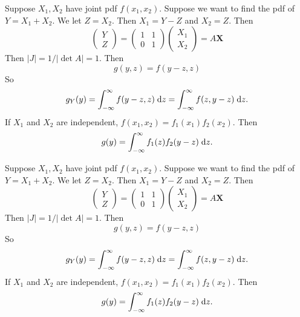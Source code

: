 \begin{note}
  \begin{field}
    \begin{eg}
      Suppose $X_1, X_2$ have joint pdf $f(x_1,x_2)$. Suppose we want to find the pdf of $Y = X_1 + X_2$. We let $Z = X_2$. Then $X_1 = Y - Z$ and $X_2 = Z$. Then
      \[
        \begin{pmatrix}
          Y\\
          Z
        \end{pmatrix} =
        \begin{pmatrix}
          1 & 1 \\
          0 & 1
        \end{pmatrix}
        \begin{pmatrix}
          X_1\\
          X_2
        \end{pmatrix}
        = A\mathbf{X}
      \]
      Then $|J| = 1/|\det A| = 1$. Then
      \[
        g(y, z) = f(y - z, z)
      \]
      So
      \[
        g_Y(y) = \int_{-\infty}^\infty f(y - z, z)\;\mathrm{d} z = \int_{-\infty}^\infty f(z, y - z)\;\mathrm{d} z.
      \]
      If $X_1$ and $X_2$ are independent, $f(x_1, x_2) = f_1(x_1) f_2(x_2)$. Then
      \[
        g(y) = \int_{-\infty}^\infty f_1(z) f_2(y - z)\;\mathrm{d} z.
      \]
    \end{eg}
  \end{field}
  \begin{field}
    \begin{eg}
      Suppose $X_1, X_2$ have joint pdf $f(x_1,x_2)$. Suppose we want to find the pdf of $Y = X_1 + X_2$. We let $Z = X_2$. Then $X_1 = Y - Z$ and $X_2 = Z$. Then
      \[
        \begin{pmatrix}
          Y\\
          Z
        \end{pmatrix} =
        \begin{pmatrix}
          1 & 1 \\
          0 & 1
        \end{pmatrix}
        \begin{pmatrix}
          X_1\\
          X_2
        \end{pmatrix}
        = A\mathbf{X}
      \]
      Then $|J| = 1/|\det A| = 1$. Then
      \[
        g(y, z) = f(y - z, z)
      \]
      So
      \[
        g_Y(y) = \int_{-\infty}^\infty f(y - z, z)\;\mathrm{d} z = \int_{-\infty}^\infty f(z, y - z)\;\mathrm{d} z.
      \]
      If $X_1$ and $X_2$ are independent, $f(x_1, x_2) = f_1(x_1) f_2(x_2)$. Then
      \[
        g(y) = \int_{-\infty}^\infty f_1(z) f_2(y - z)\;\mathrm{d} z.
      \]
    \end{eg}
  \end{field}
  \xplain{}%
\end{note}

